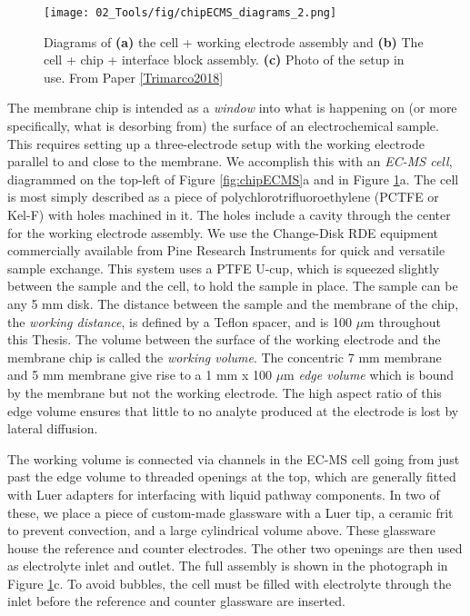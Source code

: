 \begin{figure}[h!]
	\centering
	\texttt{[image: 02\_Tools/fig/chipECMS\_diagrams\_2.png]}
	\caption{Diagrams of \textbf{(a)} the cell + working electrode assembly and \textbf{(b)} The cell + chip + interface block assembly. \textbf{(c)} Photo of the setup in use. From Paper \ref{Trimarco2018}}
	\label{fig:chipECMS2}
\end{figure}

The membrane chip is intended as a \textit{window} into what is happening on (or more specifically, what is desorbing from) the surface of an electrochemical sample. This requires setting up a three-electrode setup with the working electrode parallel to and close to the membrane. We accomplish this with an \textit{EC-MS cell}, diagrammed on the top-left of Figure \ref{fig:chipECMS}a and in Figure \ref{fig:chipECMS2}a. The cell is most simply described as a piece of polychlorotrifluoroethylene (PCTFE or Kel-F) with holes machined in it. The holes include a cavity through the center for the working electrode assembly. We use the Change-Disk RDE equipment commercially available from Pine Research Instruments for quick and versatile sample exchange. This system uses a PTFE U-cup, which is squeezed slightly between the sample and the cell, to hold the sample in place. The sample can be any 5 mm disk. The distance between the sample and the membrane of the chip, the \textit{working distance}, is defined by a Teflon spacer, and is 100 $\mu$m throughout this Thesis. The volume between the surface of the working electrode and the membrane chip is called the \textit{working volume}. The concentric 7 mm membrane and 5 mm membrane give rise to a 1 mm x 100 $\mu$m \textit{edge volume} which is bound by the membrane but not the working electrode. The high aspect ratio of this edge volume ensures that little to no analyte produced at the electrode is lost by lateral diffusion. 

The working volume is connected via channels in the EC-MS cell going from just past the edge volume to threaded openings at the top, which are generally fitted with Luer adapters for interfacing with liquid pathway components. In two of these, we place a piece of custom-made glassware with a Luer tip, a ceramic frit to prevent convection, and a large cylindrical volume above. These glassware house the reference and counter electrodes. The other two openings are then used as electrolyte inlet and outlet. The full assembly is shown in the photograph in Figure \ref{fig:chipECMS2}c. To avoid bubbles, the cell must be filled with electrolyte through the inlet before the reference and counter glassware are inserted.

